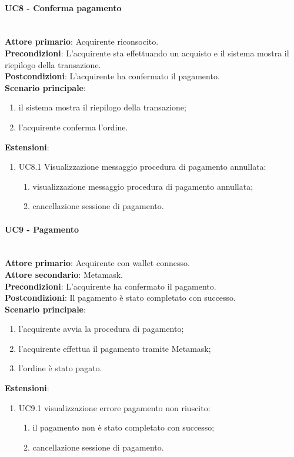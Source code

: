 \documentclass[a4paper, 12pt]{article}
\begin{document}
\paragraph{UC8 - Conferma pagamento}\\
\textbf{Attore primario}: Acquirente riconsocito.\\
\textbf{Precondizioni}: L'acquirente sta effettuando un acquisto e il sistema mostra il riepilogo della transazione.\\
\textbf{Postcondizioni}: L'acquirente ha confermato il pagamento.\\
\textbf{Scenario principale}:
\begin{enumerate}
    \item il sistema mostra il riepilogo della transazione;
    \item l'acquirente conferma l'ordine.
\end{enumerate}
\textbf{Estensioni}:
\begin{enumerate}
    \item UC8.1 Visualizzazione messaggio procedura di pagamento annullata:
    \begin{enumerate}
        \item visualizzazione messaggio procedura di pagamento annullata;
        \item cancellazione sessione di pagamento.
    \end{enumerate}
\end{enumerate}

\paragraph{UC9 - Pagamento}\\
\textbf{Attore primario}: Acquirente con wallet connesso.\\
\textbf{Attore secondario}: Metamask.\\
\textbf{Precondizioni}: L'acquirente ha confermato il pagamento.\\
\textbf{Postcondizioni}: Il pagamento è stato completato con successo.\\
\textbf{Scenario principale}:
\begin{enumerate}
    \item l'acquirente avvia la procedura di pagamento;
    \item l'acquirente effettua il pagamento tramite Metamask;
    \item l'ordine è stato pagato.
\end{enumerate}
\textbf{Estensioni}:
\begin{enumerate}
    \item UC9.1 visualizzazione errore pagamento non riuscito:
    \begin{enumerate}
        \item il pagamento non è stato completato con successo;
        \item cancellazione sessione di pagamento.
    \end{enumerate}
\end{enumerate}
\end{document}
